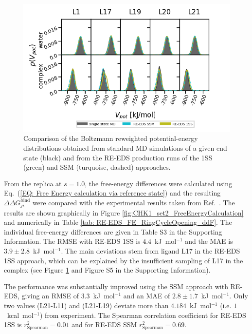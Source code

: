 \begin{figure}[h]
    \centering
    \includegraphics[width=\columnwidth]{fig/results/ringOpening/FE/RingClosure_system_final_sampling.png}
    \caption{Comparison of the Boltzmann reweighted potential-energy distributions obtained from standard MD simulations of a given end state (black) and from the RE-EDS production runs of the 1SS (green) and SSM (turquoise, dashed) approaches.}
    \label{fig:RingOpening_sampling_comparison}
\end{figure}

From the replica at $s=1.0$, the free-energy differences were calculated using Eq.~(\ref{EQ: Free Energy calculation via reference state}) and the resulting $\Delta \Delta G^\text{bind}_{ji}$ were compared with the experimental results taken from Ref.~\cite{Huang2012}. The results are shown graphically in Figure \ref{fig:CHK1_set2_FreeEnergyCalculation} and numerically in Table \ref{tab: RE-EDS_FE_RingCycleOpening_ddF}. The individual free-energy differences are given in Table S3 in the Supporting Information. %
The RMSE with RE-EDS 1SS is $4.4$~kJ~mol$^{-1}$ and the MAE is $3.9\pm2.8$~kJ~mol$^{-1}$. 
%
%
The main deviations stem from ligand L17 in the RE-EDS 1SS approach, which can be explained by the insufficient sampling of L17 in the complex (see Figure \ref{fig:RingOpening_sampling_comparison} and Figure S5 in the Supporting Information). %

The performance was substantially improved using the SSM approach with RE-EDS, giving an RMSE of $3.3$~kJ~mol$^{-1}$ and an MAE of $2.8 \pm 1.7$~kJ~mol$^{-1}$. 
Only two values (L21-L11) and (L21-L19) deviate more than $4.184$~kJ~mol$^{-1}$ (i.e. $1$~kcal~mol$^{-1}$) from experiment.
The Spearman correlation coefficient for RE-EDS 1SS is $r^2_{\text{Spearman}}=0.01$ and for RE-EDS SSM $r^2_{\text{Spearman}}=0.69$.

